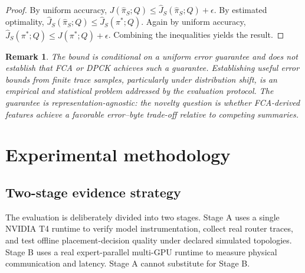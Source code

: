\documentclass[a4paper,preprint,review,12pt,authoryear]{elsarticle}
\newtheorem{remark}{Remark}
\begin{document}
\begin{proof}
By uniform accuracy, $J(\widehat\pi_S;Q)\le\widehat J_S(\widehat\pi_S;Q)+\epsilon$. By estimated optimality, $\widehat J_S(\widehat\pi_S;Q)\le\widehat J_S(\pi^*;Q)$. Again by uniform accuracy, $\widehat J_S(\pi^*;Q)\le J(\pi^*;Q)+\epsilon$. Combining the inequalities yields the result.
\end{proof}

\begin{remark}
The bound is conditional on a uniform error guarantee and does not establish that FCA or DPCK achieves such a guarantee. Establishing useful error bounds from finite trace samples, particularly under distribution shift, is an empirical and statistical problem addressed by the evaluation protocol. The guarantee is representation-agnostic: the novelty question is whether FCA-derived features achieve a favorable error--byte trade-off relative to competing summaries.
\end{remark}

\section{Experimental methodology}
\label{sec:method}

\subsection{Two-stage evidence strategy}

The evaluation is deliberately divided into two stages. Stage A uses a single NVIDIA T4 runtime to verify model instrumentation, collect real router traces, and test offline placement-decision quality under declared simulated topologies. Stage B uses a real expert-parallel multi-GPU runtime to measure physical communication and latency. Stage A cannot substitute for Stage B.
\end{document}
